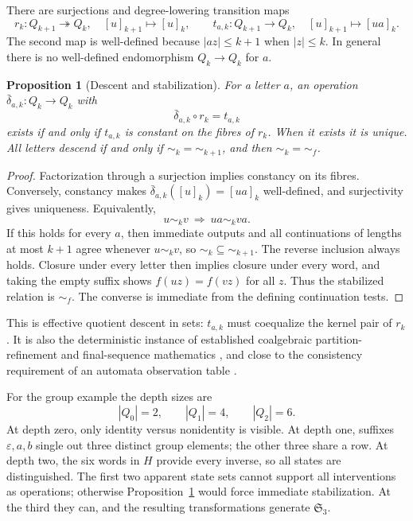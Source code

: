 \documentclass[11pt]{article}
\newtheorem{proposition}[theorem]{Proposition}
\theoremstyle{remark}
\newcommand{\eps}{\varepsilon}
\newcommand{\sg}{\mathfrak S_3}
\begin{document}
There are surjections and degree-lowering transition maps
\[
 r_k:Q_{k+1}\twoheadrightarrow Q_k,
 \quad [u]_{k+1}\mapsto[u]_k,
 \qquad
 t_{a,k}:Q_{k+1}\longrightarrow Q_k,
 \quad [u]_{k+1}\mapsto[ua]_k.
\]
The second map is well-defined because $|az|\le k+1$ when $|z|\le k$. In general there is no well-defined endomorphism $Q_k\to Q_k$ for $a$.

\begin{proposition}[Descent and stabilization]
\label{prop:descent}
For a letter $a$, an operation $\bar\delta_{a,k}:Q_k\to Q_k$ with
\[
 \bar\delta_{a,k}\circ r_k=t_{a,k}
\]
exists if and only if $t_{a,k}$ is constant on the fibres of $r_k$. When it exists it is unique. All letters descend if and only if $\sim_k=\sim_{k+1}$, and then $\sim_k=\sim_f$.
\end{proposition}
\begin{proof}
Factorization through a surjection implies constancy on its fibres. Conversely, constancy makes $\bar\delta_{a,k}([u]_k)=[ua]_k$ well-defined, and surjectivity gives uniqueness. Equivalently,
\[
 u\sim_k v\ \Longrightarrow\ ua\sim_k va.
\]
If this holds for every $a$, then immediate outputs and all continuations of lengths at most $k+1$ agree whenever $u\sim_k v$, so $\sim_k\subseteq\sim_{k+1}$. The reverse inclusion always holds. Closure under every letter then implies closure under every word, and taking the empty suffix shows $f(uz)=f(vz)$ for all $z$. Thus the stabilized relation is $\sim_f$. The converse is immediate from the defining continuation tests.
\end{proof}

This is effective quotient descent in sets: $t_{a,k}$ must coequalize the kernel pair of $r_k$. It is also the deterministic instance of established coalgebraic partition-refinement and final-sequence mathematics \cite{Dorsch}, and close to the consistency requirement of an automata observation table \cite{Angluin,CALF}.

For the group example the depth sizes are
\[
 |Q_0|=2,\qquad |Q_1|=4,\qquad |Q_2|=6.
\]
At depth zero, only identity versus nonidentity is visible. At depth one, suffixes $\eps,a,b$ single out three distinct group elements; the other three share a row. At depth two, the six words in $H$ provide every inverse, so all states are distinguished. The first two apparent state sets cannot support all interventions as operations; otherwise Proposition~\ref{prop:descent} would force immediate stabilization. At the third they can, and the resulting transformations generate $\sg$.
\end{document}
